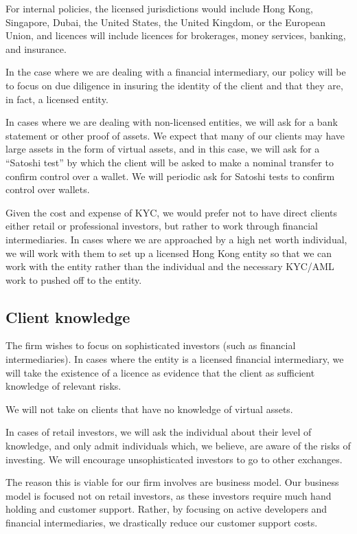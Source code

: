 For internal policies, the licensed jurisdictions would
include Hong Kong, Singapore, Dubai, the United States, the United
Kingdom, or the European Union, and licences will include licences for
brokerages, money services, banking, and insurance.

In the case where we are dealing with a financial intermediary, our
policy will be to focus on due diligence in insuring the identity of
the client and that they are, in fact, a licensed entity.

In cases where we are dealing with non-licensed entities, we will ask
for a bank statement or other proof of assets.  We expect that many of
our clients may have large assets in the form of virtual assets, and
in this case, we will ask for a ``Satoshi test'' by which the client
will be asked to make a nominal transfer to confirm control over a
wallet.  We will periodic ask for Satoshi tests to confirm control
over wallets.

Given the cost and expense of KYC, we would prefer not to have direct
clients either retail or professional investors, but rather to work
through financial intermediaries.  In cases where we are approached by
a high net worth individual, we will work with them to set up a licensed
Hong Kong entity so that we can work with the entity rather than the
individual and the necessary KYC/AML work to pushed off to the entity.

\subsection{Client knowledge}

The firm wishes to focus on sophisticated investors (such as financial
intermediaries).  In cases where the entity is a licensed
financial intermediary, we will take the existence of a licence as
evidence that the client as sufficient knowledge of relevant risks.

We will not take on clients that have no knowledge of virtual assets.

In cases of retail investors, we will ask the individual about their
level of knowledge, and only admit individuals which, we believe, are
aware of the risks of investing.  We will encourage unsophisticated
investors to go to other exchanges.

The reason this is viable for our firm involves are business model.
Our business model is focused not on retail investors, as these
investors require much hand holding and customer support.  Rather, by
focusing on active developers and financial intermediaries, we
drastically reduce our customer support costs.

